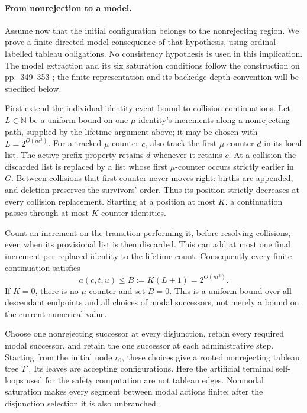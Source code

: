 \paragraph{From nonrejection to a model.}
\label{sec:p09-kozen-nonrejection-model}
Assume now that the initial configuration belongs to the
nonrejecting region. We prove a finite directed-model
consequence of that hypothesis, using ordinal-labelled
tableau obligations. No consistency hypothesis is used in
this implication. The model extraction and its six
saturation conditions follow the construction on
pp.~349--353 \cite{Kozen1983}; the finite representation
and its backedge-depth convention will be specified below.

First extend the individual-identity event bound to
collision continuations. Let \(L\in\mathbb N\) be a
uniform bound on one \(\mu\)-identity's increments
along a nonrejecting path, supplied by the lifetime
argument above; it may be chosen with
\(L=2^{O(m^3)}\). For a tracked \(\mu\)-counter
\(c\), also track the first \(\mu\)-counter \(d\)
in its local list. The active-prefix property retains
\(d\) whenever it retains \(c\). At a collision the
discarded list is replaced by a list whose first
\(\mu\)-counter occurs strictly earlier in \(G\).
Between collisions that first counter never moves
right: births are appended, and deletion preserves
the survivors' order. Thus its position strictly
decreases at every collision replacement. Starting
at a position at most \(K\), a continuation passes
through at most \(K\) counter identities.

Count an increment on the transition performing it,
before resolving collisions, even when its provisional
list is then discarded. This can add at most one final
increment per replaced identity to the lifetime count.
Consequently every finite continuation satisfies
\[
 a(c,t,u)\leq B:=K(L+1)=2^{O(m^3)}.
\]
If \(K=0\), there is no \(\mu\)-counter and set
\(B=0\). This is a uniform bound over all descendant
endpoints and all choices of modal successors, not
merely a bound on the current numerical value.

Choose one nonrejecting successor at every disjunction,
retain every required modal successor, and retain the
one successor at each administrative step. Starting
from the initial node \(r_0\), these choices give a
rooted nonrejecting tableau tree \(T'\). Its leaves
are accepting configurations. Here the artificial
terminal self-loops used for the safety computation
are not tableau edges. Nonmodal saturation makes
every segment between modal actions finite; after
the disjunction selection it is also unbranched.

